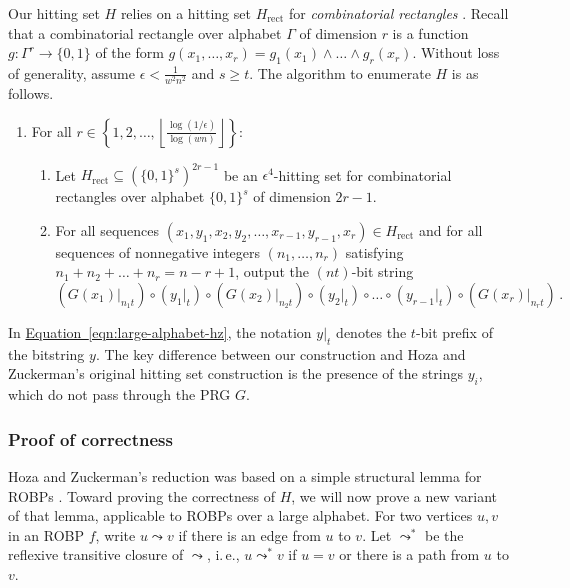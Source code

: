 \documentclass[11pt]{article}
\numberwithin{equation}{section}
\theoremstyle{definition}
\theoremstyle{plain}
\newcommand{\ie}{i.\,e.}
\newcommand{\expeqref}[2]{\hyperref[#2]{#1~\eqref{#2}}}
\begin{document}
Our hitting set $H$ relies on a hitting set $H_{\text{rect}}$ for \emph{combinatorial rectangles} \cite{LLSZ97}. Recall that a combinatorial rectangle over alphabet $\Gamma$ of dimension $r$ is a function $g \colon \Gamma^r \to \{0, 1\}$ of the form $g(x_1, \dots, x_r) = g_1(x_1) \wedge \dots \wedge g_r(x_r)$. Without loss of generality, assume $\epsilon < \frac{1}{w^2 n^2}$ and $s \geq t$. The algorithm to enumerate $H$ is as follows.
\begin{enumerate}
\item For all $r \in \left\{1, 2, \dots, \left\lfloor \frac{\log(1/\epsilon)}{\log(wn)} \right\rfloor\right\}$:
\begin{enumerate}
\item Let $H_{\text{rect}} \subseteq (\{0, 1\}^s)^{2r - 1}$ be an $\epsilon^4$-hitting set for combinatorial rectangles over alphabet $\{0, 1\}^s$ of dimension $2r - 1$.
\item For all sequences $(x_1, y_1, x_2, y_2, \dots, x_{r - 1}, y_{r - 1}, x_r) \in H_{\text{rect}}$ and for all sequences of nonnegative integers $(n_1, \dots, n_r)$ satisfying $n_1 + n_2 + \dots + n_r = n - r + 1$, output the $(nt)$-bit string
\begin{equation} \label{eqn:large-alphabet-hz}
(G(x_1)|_{n_1 t}) \circ (y_1|_t) \circ (G(x_2)|_{n_2 t}) \circ (y_2|_t) \circ \dots \circ (y_{r - 1}|_t) \circ (G(x_r)|_{n_r t})\,.
\end{equation}
\end{enumerate}
\end{enumerate}
In \expeqref{Equation}{eqn:large-alphabet-hz}, the notation $y|_t$ denotes the $t$-bit prefix of the bitstring $y$. The key difference between our construction and Hoza and Zuckerman's original hitting set construction \cite{HZ20} is the presence of the strings $y_i$, which do not pass through the PRG $G$.

\subsubsection{Proof of correctness}

Hoza and Zuckerman's reduction was based on a simple structural lemma for ROBPs \cite[Lemma 1]{HZ20}. Toward proving the correctness of $H$, we will now prove a new variant of that lemma, applicable to ROBPs over a large alphabet. For two vertices $u, v$ in an ROBP $f$, write $u \leadsto v$ if there is an edge from $u$ to $v$. Let $\leadsto^*$ be the reflexive transitive closure of $\leadsto$, \ie, $u \leadsto^* v$ if $u = v$ or there is a path from $u$ to $v$.
\end{document}
